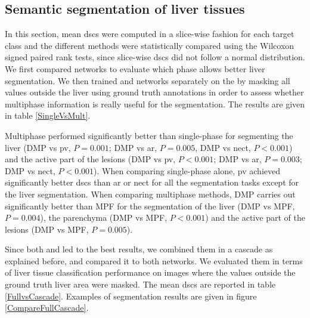 \subsection{Semantic segmentation of liver tissues}

In this section, mean \ac{dsc}s were computed in a slice-wise fashion for each target class and the different methods were statistically compared using the Wilcoxon 
signed paired rank tests, since slice-wise \ac{dsc}s did not follow a normal distribution. 
We first compared  networks
 to evaluate which phase allows better liver segmentation. 
 We then trained  and   networks separately on the \textbf{} by masking all values outside the liver using ground truth annotations in order to assess whether multiphase information is really useful for the segmentation. The results are given in table \ref{SingleVsMult}.

Multiphase performed significantly better than single-phase for segmenting the liver (DMP vs \ac{pv}, $P=0.001$; DMP vs \ac{ar}, $P=0.005$, DMP vs \ac{nect}, $P<0.001$) and the active part of the lesions (DMP vs \ac{pv}, $P<0.001$; DMP vs \ac{ar}, $P=0.003$; DMP vs \ac{nect}, $P<0.001$). When comparing single-phase alone, \ac{pv} achieved significantly better \ac{dsc}s than \ac{ar} or \ac{nect} for all the segmentation tasks except for the liver segmentation. When comparing multiphase methods, DMP carries out significantly better than MPF for the segmentation of the liver (DMP vs MPF, $P=0.004$), the parenchyma (DMP vs MPF, $P<0.001$) and the active part of the lesions (DMP vs MPF, $P=0.005$).

Since both  and  led to the best results, we combined them in a cascade as explained before, and compared it to both  networks. We evaluated them in terms of liver tissue classification performance on images where the values outside the ground truth liver area were masked. The mean \ac{dsc}s are reported in table \ref{FullvsCascade}. Examples of segmentation results are given in figure \ref{CompareFullCascade}. \\

